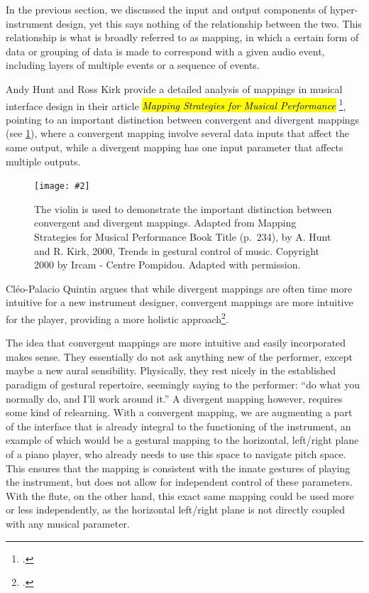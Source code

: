 \documentclass[12pt,twoside,maitrise]{dms_ks}
\newcommand{\customincludegraphics}[4][]{%
    \begin{figure}[H]
        \centering
        \texttt{[image: \#2]}
        \caption{#4}
	\label{#3} 
    \end{figure}
}
\theoremstyle{definition}
\begin{document}
{In the previous section, we discussed the input and output components of hyper-instrument design, yet this says nothing of the relationship between the two.
This relationship is what is broadly referred to as mapping, in which a certain form of data or grouping of data is made to correspond with a given audio event, including layers of multiple events or a sequence of events. 

Andy Hunt and Ross Kirk provide a detailed analysis of mappings in musical interface design in their article \hl{\textit{Mapping Strategies for Musical Performance}} \footcite{hunt_mapping_2000}, pointing to an important distinction between convergent and divergent mappings (see \cref{fig:mapping}), where a convergent mapping involve several data inputs that affect the same output, while a divergent mapping has one input parameter that affects multiple outputs. 


\customincludegraphics[scale=1]{mapping}{fig:mapping}{The violin is used to demonstrate the important distinction between convergent and divergent mappings. Adapted from Mapping Strategies for Musical Performance Book Title (p.~234), by A. Hunt and R. Kirk, 2000, Trends in gestural control of music. Copyright 2000 by Ircam - Centre Pompidou. Adapted with permission.}

Cléo-Palacio Quintin argues that while divergent mappings are often time more intuitive for a new instrument designer, convergent mappings are more intuitive for the player, providing a more holistic approach\footcite[44--45]{palacio-quintin_composition_2012-1}. 

The idea that convergent mappings are more intuitive and easily incorporated makes sense. 
They essentially do not ask anything new of the performer, except maybe a new aural sensibility. 
Physically, they rest nicely in the established paradigm of gestural repertoire, seemingly saying to the performer: “do what you normally do, and I'll work around it.” 
A divergent mapping however, requires some kind of relearning. 
With a convergent mapping, we are augmenting a part of the interface that is already integral to the functioning of the instrument, an example of which would be a gestural mapping to the horizontal, left/right plane of a piano player, who already needs to use this space to navigate pitch space.
This ensures that the mapping is consistent with the innate gestures of playing the instrument, but does not allow for independent control of these parameters.
With the flute, on the other hand, this exact same mapping could be used more or less independently, as the horizontal left/right plane is not directly coupled with any musical parameter.

}
\end{document}
